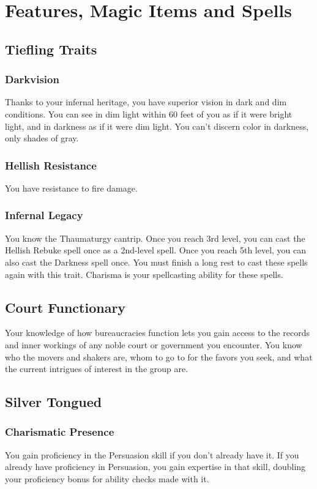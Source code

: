 \documentclass[letterpaper,openany,oneside,twocolumn]{book}
\begin{document}
\clearpage

\chapter*{Features, Magic Items and Spells}

\section*{Tiefling Traits}
\subsection*{Darkvision}
Thanks to your infernal heritage, you have superior vision in dark and dim conditions. You can see in dim light within 60 feet of you as if it were bright light, and in darkness as if it were dim light. You can't discern color in darkness, only shades of gray.
\subsection*{Hellish Resistance}
You have resistance to fire damage.
\subsection*{Infernal Legacy}
You know the Thaumaturgy cantrip. Once you reach 3rd level, you can cast the Hellish Rebuke spell once as a 2nd-level spell. Once you reach 5th level, you can also cast the Darkness spell once. You must finish a long rest to cast these spells again with this trait. Charisma is your spellcasting ability for these spells.

\section*{Court Functionary}
Your knowledge of how bureaucracies function lets you gain access to the records and inner workings of any noble court or government you encounter. You know who the movers and shakers are, whom to go to for the favors you seek, and what the current intrigues of interest in the group are.

\section*{Silver Tongued}
\subsection*{Charismatic Presence}
You gain proficiency in the Persuasion skill if you don't already have it. If you already have proficiency in Persuasion, you gain expertise in that skill, doubling your proficiency bonus for ability checks made with it.
\end{document}
